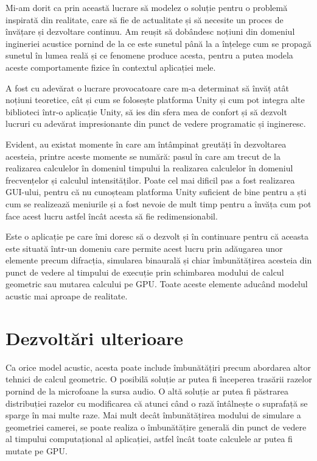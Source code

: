 	Mi-am dorit ca prin această lucrare să modelez o soluție pentru o problemă inspirată din realitate, care să fie de actualitate și să necesite un proces de învățare și dezvoltare continuu. Am reușit să dobândesc noțiuni din domeniul ingineriei acustice pornind de la ce este sunetul până la a înțelege cum se propagă sunetul în lumea reală și ce fenomene produce acesta, pentru a putea modela aceste comportamente fizice în contextul aplicației mele.
	
	A fost cu adevărat o lucrare provocatoare care m-a determinat să învăț atât noțiuni teoretice, cât și cum se folosește platforma Unity și cum pot integra alte biblioteci într-o aplicație Unity, să ies din sfera mea de confort și să dezvolt lucruri cu adevărat impresionante din punct de vedere programatic și ingineresc.
	
	Evident, au existat momente în care am întâmpinat greutăți în dezvoltarea acesteia, printre aceste momente se numără: pasul în care am trecut de la realizarea calculelor în domeniul timpului la realizarea calculelor în domeniul frecvențelor și calculul intensităților. Poate cel mai dificil pas a fost realizarea GUI-ului, pentru că nu cunoșteam platforma Unity suficient de bine pentru a ști cum se realizează meniurile și a fost nevoie de mult timp pentru a învăța cum pot face acest lucru astfel încât acesta să fie redimensionabil.
	
	Este o aplicație pe care îmi doresc să o dezvolt și în continuare pentru că aceasta este situată într-un domeniu care permite acest lucru prin adăugarea unor elemente precum difracția, simularea binaurală și chiar îmbunătățirea acesteia din punct de vedere al timpului de execuție prin schimbarea modului de calcul geometric sau mutarea calcului pe GPU. Toate aceste elemente aducând modelul acustic mai aproape de realitate.
	
\section{Dezvolt\u{a}ri ulterioare}

	Ca orice model acustic, acesta poate include îmbunătățiri precum abordarea altor tehnici de calcul geometric. O posibilă soluție ar putea fi începerea trasării razelor pornind de la microfoane la sursa audio. O altă soluție ar putea fi păstrarea distribuției razelor cu modificarea că atunci când o rază întâlnește o suprafață se sparge în mai multe raze. Mai mult decât îmbunătățirea modului de simulare a geometriei camerei, se poate realiza o  îmbunătățire generală din punct de vedere al timpului computațional al aplicației, astfel încât toate calculele ar putea fi mutate pe GPU.
	
